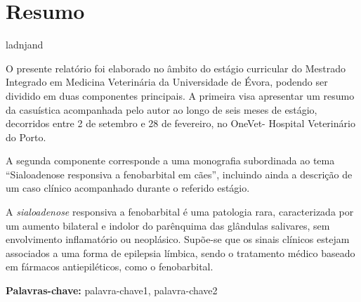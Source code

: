 
\section*{Resumo}


ladnjand

O presente relatório foi elaborado no âmbito do estágio curricular do Mestrado Integrado em Medicina Veterinária da Universidade de Évora, podendo ser dividido em duas componentes principais. A primeira visa apresentar um resumo da casuística acompanhada pelo autor ao longo de seis meses de estágio, decorridos entre 2 de setembro e 28 de fevereiro, no OneVet- Hospital Veterinário do Porto.

A segunda componente corresponde a uma monografia subordinada ao tema “Sialoadenose responsiva a fenobarbital em cães”, incluindo ainda a descrição de um caso clínico acompanhado durante o referido estágio.

A \textit{sialoadenose} responsiva a fenobarbital é uma patologia rara, caracterizada por um aumento bilateral e indolor do parênquima das glândulas salivares, sem envolvimento inflamatório ou neoplásico. Supõe-se que os sinais clínicos estejam associados a uma forma de epilepsia límbica, sendo o tratamento médico baseado em fármacos antiepiléticos, como o fenobarbital. 

\vfill

\textbf{\Large Palavras-chave:} palavra-chave1, palavra-chave2

